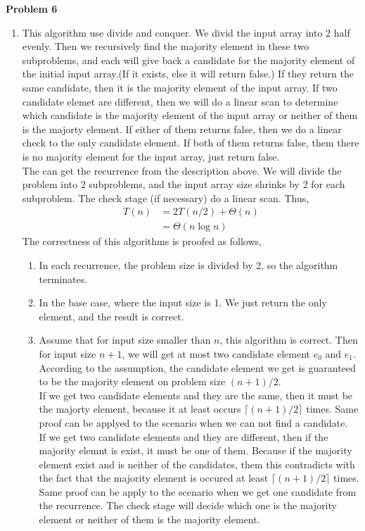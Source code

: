 \documentclass[12pt,letterpaper]{article}
\def\pp{\par\noindent}
\newcommand{\problem}[1]{ \bigskip \pp \textbf{Problem #1}\par}
\begin{document}
\problem{6}
\begin{enumerate}[label=\arabic*.]
	\item This algorithm use divide and conquer. We divid the input array into 2 half evenly. Then we recursively find the majority element in these two subproblems, and each will give back a candidate for the majority element of the initial input array.(If it exists, else it will return false.) If they return the same candidate, then it is the majority element of the input array. If two candidate elemet are different, then we will do a linear scan to determine which candidate is the majority element of the input array or neither of them is the majorty element. If either of them returns false, then we do a linear check to the only candidate element. If both of them returns false, them there is no majority element for the input array, just return false.\\
		The can get the recurrence from the description above. We will divide the problem into 2 subproblems, and the input array size shrinks by 2 for each subproblem. The check stage (if necessary) do a linear scan. Thus,
		\begin{align*}
			T(n)&=2T(n/2)+\Theta(n)\\
			&=\Theta(n\log n)
		\end{align*}
		The correctness of this algorithms is proofed as follows,
		\begin{enumerate}
			\item In each recurrence, the problem size is divided by 2, so the algorithm terminates.
			\item In the base case, where the input size is 1. We just return the only element, and the result is correct.
			\item Assume that for input size smaller than $n$, this algorithm is correct. Then for input size $n+1$, we will get at most two candidate element $e_0$ and $e_1$. According to the assumption, the candidate element we get is guaranteed to be the majority element on problem size $(n+1)/2$.\\
				If we get two candidate elements and they are the same, then it must be the majorty element, because it at least occurs $\lceil (n+1)/2\rceil$ times. Same proof can be applyed to the scenario when we can not find a candidate.\\
				If we get two candidate elements and they are different, then if the majority elemnt is exist, it must be one of them. Because if the majority element exist and is neither of the candidates, them this contradicts with the fact that the majority element is occured at least $\lceil (n+1)/2\rceil$ times. Same proof can be apply to the scenario when we get one candidate from the recurrence. The check stage will decide which one is the majority element or neither of them is the majority element.\\

\end{enumerate}
\end{enumerate}
\end{document}
